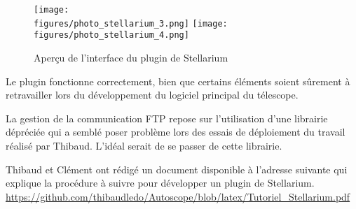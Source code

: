 \vspace{1cm}

\begin{figure}[H]
    \centering
    \texttt{[image: \\figures/photo\_stellarium\_3.png]}
    \texttt{[image: \\figures/photo\_stellarium\_4.png]}
    \decoRule
    \caption[
    Aperçu de l'interface du plugin de Stellarium]{
    Aperçu de l'interface du plugin de Stellarium}
    \label{fig:Aperçu de l'interface du plugin de Stellarium}
    \end{figure}

\vspace{1cm}

Le plugin fonctionne correctement, bien que certains éléments soient sûrement à retravailler lors du développement du logiciel principal du télescope.

La gestion de la communication FTP repose sur l'utilisation d'une librairie dépréciée  qui a semblé poser problème lors des essais de déploiement du travail réalisé par Thibaud. L'idéal serait de se passer de cette librairie.

\vspace{1cm}

Thibaud et Clément ont rédigé un document disponible à l'adresse suivante qui explique la procédure à suivre pour développer un plugin de Stellarium.
\url{https://github.com/thibaudledo/Autoscope/blob/latex/Tutoriel_Stellarium.pdf}
